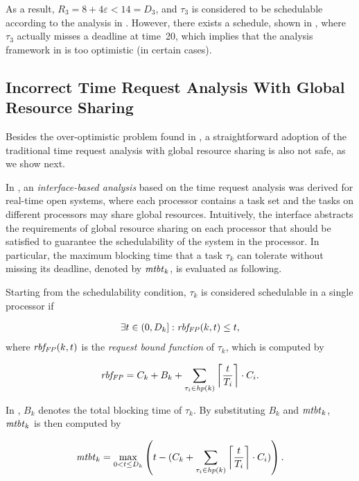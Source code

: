 As a result, $R_3 = 8+4\varepsilon < 14 = D_3$, and $\tau_3$ is considered to be schedulable according to the analysis in \cite{lakshmanan-2009}. However, there exists a schedule, shown in , where $\tau_3$  actually misses a deadline at time~20, which implies that the analysis framework in \cite{lakshmanan-2009} is too optimistic (in certain cases). 

\subsection{Incorrect Time Request Analysis With Global Resource Sharing}

Besides the over-optimistic problem found in \citep{lakshmanan-2009}, a straightforward adoption of the traditional time request analysis with global resource sharing is also not safe, as we show next.

 In \cite{NBN:11}, an \emph{interface-based analysis} based on the time request analysis was derived for real-time open systems, where each processor contains a task set and the tasks on different processors may share global resources. Intuitively, the interface abstracts the requirements of global resource sharing on each processor that should be satisfied to guarantee the schedulability of the system in the processor. In particular, the maximum blocking time that a task $\tau_k$ can tolerate without missing its deadline, denoted by $\mathit{mtbt}_k$, is evaluated as following. 

Starting from the schedulability condition, $\tau_k$ is considered schedulable in a single processor if

\begin{align}\label{eq:rbf-1}
\exists t \in (0,D_k]: \fun{rbf_{FP}}(k,t) \leq t, 
\end{align}
where $\mathit{rbf_{FP}}(k,t)$ is the \emph{request bound function} of $\tau_k$, which is computed by

\begin{align}\label{eq:rbf-2}
\fun{rbf_{FP}} = C_k + B_k + \sum_{\tau_i \in \fun{hp}(k)} \left \lceil \frac{t}{T_i} \right \rceil \cdot C_i.
\end{align}

In , $B_k$ denotes the total blocking time of $\tau_k$. By substituting $B_k$ and $\mathit{mtbt}_k$, $\mathit{mtbt}_k$ is then computed by

\begin{align}\label{eq:bloc-tolerate}
\fun{mtbt}_k = \max_{0<t \leq D_k} \left( t - ( C_k + \sum_{\tau_i \in \fun{hp}(k)} \left \lceil \frac{t}{T_i} \right \rceil \cdot C_i ) \right).
\end{align}

